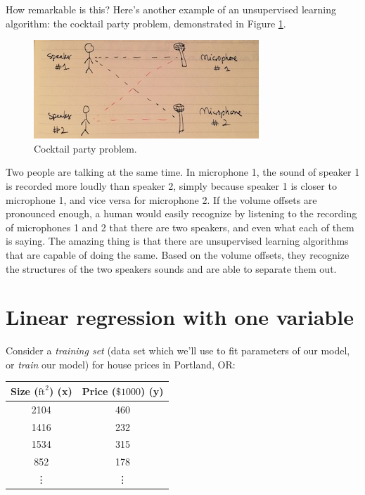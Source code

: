 \documentclass{article}
\begin{document}
How remarkable is this? Here's another example of an unsupervised learning algorithm: the cocktail party problem, demonstrated in Figure \ref{intro-cocktail}.

\begin{figure}[ht]
\centering
\includegraphics[scale=0.8]{images/intro/cocktail.jpg}
\caption{Cocktail party problem.}
\label{intro-cocktail}
\end{figure}

Two people are talking at the same time. In microphone 1, the sound of speaker 1 is recorded more loudly than speaker 2, simply because speaker 1 is closer to microphone 1, and vice versa for microphone 2. If the volume offsets are pronounced enough, a human would easily recognize by listening to the recording of microphones 1 and 2 that there are two speakers, and even what each of them is saying. The amazing thing is that there are unsupervised learning algorithms that are capable of doing the same. Based on the volume offsets, they recognize the structures of the two speakers sounds and are able to separate them out.


\section{Linear regression with one variable}
Consider a \textit{training set} (data set which we'll use to fit parameters of our model, or \textit{train} our model) for house prices in Portland, OR:

\begin{center}
\begin{tabular}{ |c|c| } 
 \hline
 Size ($\text{ft}^2$) (x) & Price ($\$1000$) (y) \\
 \hline
 2104 & 460 \\
 1416 & 232 \\
 1534 & 315 \\
 852 & 178 \\
 \vdots & \vdots \\
 \hline
\end{tabular}
\end{center}
\end{document}
